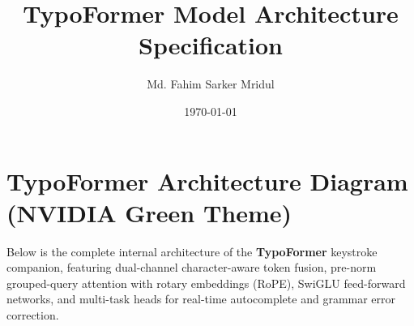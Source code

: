 \documentclass[11pt,a4paper]{article}
\begin{document}
\title{\textbf{TypoFormer Model Architecture Specification}}
\author{Md. Fahim Sarker Mridul}
\date{\today}
\maketitle

\section{TypoFormer Architecture Diagram (NVIDIA Green Theme)}
Below is the complete internal architecture of the \textbf{TypoFormer} keystroke companion, featuring dual-channel character-aware token fusion, pre-norm grouped-query attention with rotary embeddings (RoPE), SwiGLU feed-forward networks, and multi-task heads for real-time autocomplete and grammar error correction.
\end{document}
